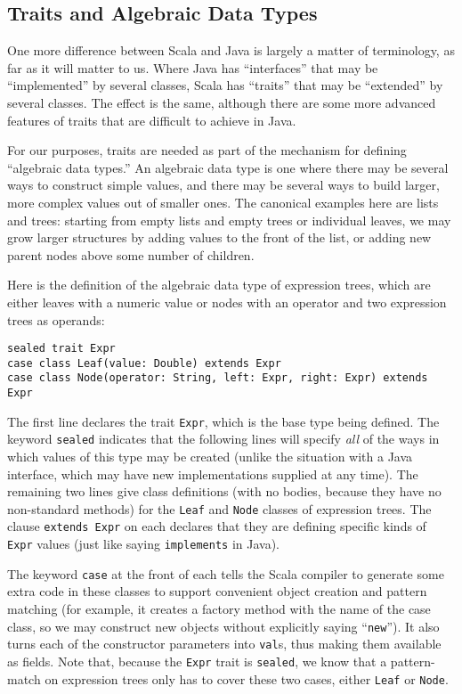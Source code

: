 \documentclass[11pt]{article}
\begin{document}
\subsection{Traits and Algebraic Data Types}
One more difference between Scala and Java is largely a matter of terminology, as far as it will matter to us. Where Java has ``interfaces'' that may be ``implemented'' by several classes, Scala has ``traits'' that may be ``extended'' by several classes. The effect is the same, although there are some more advanced features of traits that are difficult to achieve in Java.

For our purposes, traits are needed as part of the mechanism for defining ``algebraic data types.'' An algebraic data type is one where there may be several ways to construct simple values, and there may be several ways to build larger, more complex values out of smaller ones. The canonical examples here are lists and trees: starting from empty lists and empty trees or individual leaves, we may grow larger structures by adding values to the front of the list, or adding new parent nodes above some number of children.

Here is the definition of the algebraic data type of expression trees, which are either leaves with a numeric value or nodes with an operator and two expression trees as operands:
\begin{verbatim}
sealed trait Expr
case class Leaf(value: Double) extends Expr
case class Node(operator: String, left: Expr, right: Expr) extends Expr
\end{verbatim}
The first line declares the trait \texttt{Expr}, which is the base type being defined. The keyword \texttt{sealed} indicates that the following lines will specify \emph{all} of the ways in which values of this type may be created (unlike the situation with a Java interface, which may have new implementations supplied at any time). The remaining two lines give class definitions (with no bodies, because they have no non-standard methods) for the \texttt{Leaf} and \texttt{Node} classes of expression trees. The clause \texttt{extends Expr} on each declares that they are defining specific kinds of \texttt{Expr} values (just like saying \texttt{implements} in Java).

The keyword \texttt{case} at the front of each tells the Scala compiler to generate some extra code in these classes to support convenient object creation and pattern matching (for example, it creates a factory method with the name of the case class, so we may construct new objects without explicitly saying ``\texttt{new}''). It also turns each of the constructor parameters into \texttt{val}s, thus making them available as fields. Note that, because the \texttt{Expr} trait is \texttt{sealed}, we know that a pattern-match on expression trees only has to cover these two cases, either \texttt{Leaf} or \texttt{Node}.
\end{document}
